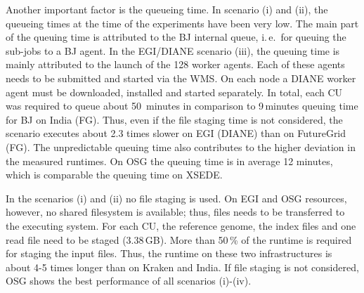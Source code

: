 \documentclass[conference,final]{IEEEtran}
\newcommand{\cu}{CU\xspace}
\begin{document}
Another important factor is the queueing time. In scenario (i) and (ii), the
queueing times at the time of the experiments have been very low. The main part
of the queuing time is attributed to the BJ internal queue, i.\,e.\ for queuing
the sub-jobs to a BJ agent. In the EGI/DIANE scenario (iii), the queuing time is
mainly attributed to the launch of the 128 worker agents. Each of these agents
needs to be submitted and started via the WMS. On each node a DIANE worker agent
must be downloaded, installed and started separately. In total, each \cu was
required to queue about 50\, minutes in comparison to 9\,minutes queuing time
for BJ on India (FG). Thus, even if the file staging time is not considered, the
scenario executes about 2.3 times slower on EGI (DIANE) than on FutureGrid (FG).
The unpredictable queuing time also contributes to the higher deviation in the
measured runtimes. On OSG the queuing time is in average 12 minutes, which is
comparable the queuing time on XSEDE. 

In the scenarios (i) and (ii) no file staging is used. On EGI and OSG resources,
however, no shared filesystem is available; thus, files needs to be transferred
to the executing system. For each \cu, the reference genome, the index files
and one read file need to be staged (3.38\,GB). More than 50\,\% of the runtime
is required for staging the input files. Thus, the runtime on these two
infrastructures is about 4-5 times longer than on Kraken and India. If file
staging is not considered, OSG shows the best performance of all scenarios
(i)-(iv).





\end{document}
